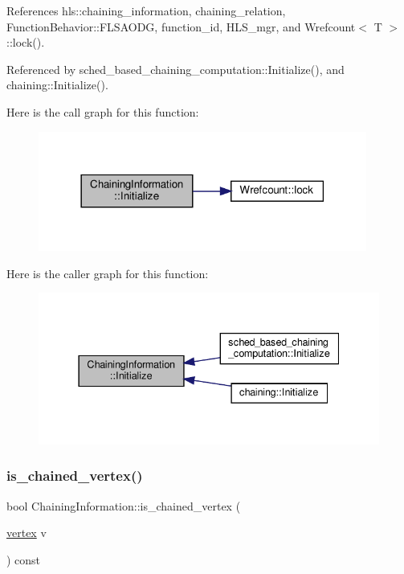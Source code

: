 References hls\+::chaining\+\_\+information, chaining\+\_\+relation, Function\+Behavior\+::\+F\+L\+S\+A\+O\+DG, function\+\_\+id, H\+L\+S\+\_\+mgr, and Wrefcount$<$ T $>$\+::lock().



Referenced by sched\+\_\+based\+\_\+chaining\+\_\+computation\+::\+Initialize(), and chaining\+::\+Initialize().

Here is the call graph for this function\+:
\nopagebreak
\begin{figure}[H]
\begin{center}
\leavevmode
\includegraphics[width=306pt]{d8/d93/classChainingInformation_a932253df325db11aea294c1d53f16950_cgraph}
\end{center}
\end{figure}
Here is the caller graph for this function\+:
\nopagebreak
\begin{figure}[H]
\begin{center}
\leavevmode
\includegraphics[width=337pt]{d8/d93/classChainingInformation_a932253df325db11aea294c1d53f16950_icgraph}
\end{center}
\end{figure}
\mbox{\label{classChainingInformation_a1c54e6712525921dfbf1761db84e0bf2}} 
\subsubsection{\texorpdfstring{is\+\_\+chained\+\_\+vertex()}{is\_chained\_vertex()}}
{\footnotesize\ttfamily bool Chaining\+Information\+::is\+\_\+chained\+\_\+vertex (\begin{DoxyParamCaption}\item[{\hyperlink{graph_8hpp_abefdcf0544e601805af44eca032cca14}{vertex}}]{v }\end{DoxyParamCaption}) const}



